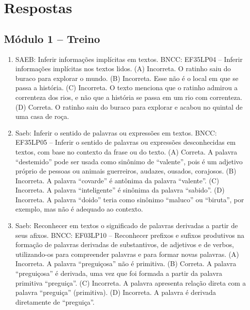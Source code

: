 \chapter{Respostas}
\pagestyle{plain}
\footnotesize

\pagecolor{gray!40}

\section*{Módulo 1 – Treino}

\begin{enumerate}
\item
SAEB: Inferir informações implícitas em textos. BNCC: EF35LP04 -- Inferir informações implícitas nos textos lidos. (A) Incorreta. O ratinho saiu do buraco para explorar o mundo. (B) Incorreta. Esse não é o local em que se passa a história. (C) Incorreta. O texto menciona que o ratinho admirou a correnteza dos rios, e não que a história se passa em um rio com correnteza. (D) Correta. O ratinho saiu do buraco para explorar e acabou no quintal de uma casa de roça.

\item
Saeb: Inferir o sentido de palavras ou expressões em textos.
BNCC: EF35LP05 -- Inferir o sentido de palavras ou expressões
desconhecidas em textos, com base no contexto da frase ou do texto.
(A) Correta. A palavra ``destemido'' pode ser usada como sinônimo de
``valente'', pois é um adjetivo próprio de pessoas ou animais
guerreiros, audazes, ousados, corajosos.
(B) Incorreta. A palavra ``covarde'' é antônima da palavra ``valente''.
(C) Incorreta. A palavra ``inteligente'' é sinônima da palavra
``sabido''.
(D) Incorreta. A palavra ``doido'' teria como sinônimo ``maluco'' ou
``biruta'', por exemplo, mas não é adequado ao contexto.

\item
Saeb: Reconhecer em textos o significado de palavras derivadas a partir de seus afixos.
BNCC: EF03LP10 -- Reconhecer prefixos e sufixos produtivos na formação de
palavras derivadas de substantivos, de adjetivos e de verbos,
utilizando-os para compreender palavras e para formar novas palavras.
(A) Incorreta. A palavra ``preguiçosa'' não é primitiva.
(B) Correta. A palavra ``preguiçosa'' é derivada, uma vez que foi
formada a partir da palavra primitiva ``preguiça''.
(C) Incorreta. A palavra apresenta relação direta com a palavra
``preguiça'' (primitiva).
(D) Incorreta. A palavra é derivada diretamente de ``preguiça''.
\end{enumerate}

